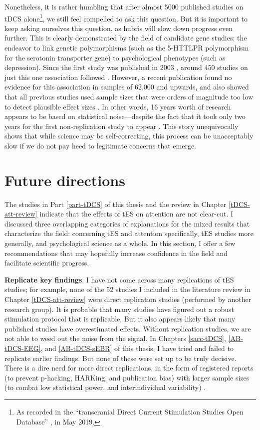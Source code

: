\documentclass[11pt,english,]{memoir}
\let\rmarkdownfootnote\footnote%
\def\footnote{\protect\rmarkdownfootnote}
\begin{document}
Nonetheless, it is rather humbling that after almost 5000 published studies on tDCS alone\footnote{As recorded in the ``transcranial Direct Current Stimulation Studies Open Database'' \autocite[\url{http://tdcsdatabase.com};][]{Grossman2018}, in May 2019.}, we still feel compelled to ask this question. But it is important to keep asking ourselves this question, as hubris will slow down progress even further. This is clearly demonstrated by the field of candidate gene studies: the endeavor to link genetic polymorphisms (such as the 5-HTTLPR polymorphism for the serotonin transporter gene) to psychological phenotypes (such as depression). Since the first study was published in 2003 \autocite{Caspi2003}, around 450 studies on just this one association followed \autocite{Border2019}. However, a recent publication found no evidence for this association in samples of 62,000 and upwards, and also showed that all previous studies used sample sizes that were orders of magnitude too low to detect plausible effect sizes \autocite{Border2019}. In other words, 16 years worth of research appears to be based on statistical noise---despite the fact that it took only two years for the first non-replication study \autocite{Gillespie2005} to appear \autocite{Rieckmann2009}. This story unequivocally shows that while science may be self-correcting, this process can be unacceptably slow if we do not pay heed to legitimate concerns that emerge.

\hypertarget{discussion-future}{%
\section{Future directions}\label{discussion-future}}

The studies in Part \ref{part-tDCS} of this thesis and the review in Chapter \ref{tDCS-att-review} indicate that the effects of tES on attention are not clear-cut. I discussed three overlapping categories of explanations for the mixed results that characterize the field: concerning tES and attention specifically, tES studies more generally, and psychological science as a whole. In this section, I offer a few recommendations that may hopefully increase confidence in the field and facilitate scientific progress.

\textbf{Replicate key findings}. I have not come across many replications of tES studies; for example, none of the 52 studies I included in the literature review in Chapter \ref{tDCS-att-review} were direct replication studies (performed by another research group). It is probable that many studies have figured out a robust stimulation protocol that is replicable. But it also appears likely that many published studies have overestimated effects. Without replication studies, we are not able to weed out the noise from the signal. In Chapters \ref{sacc-tDCS}, \ref{AB-tDCS-EEG}, and \ref{AB-tDCS-sEBR} of this thesis, I have tried and failed to replicate earlier findings. But none of these were set up to be truly decisive. There is a dire need for more direct replications, in the form of registered reports (to prevent p-hacking, HARKing, and publication bias) with larger sample sizes (to combat low statistical power, and interindividual variability) \autocite[e.g.][]{Boayue2019}.
\end{document}
